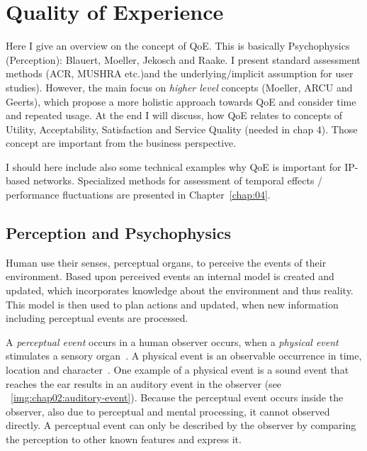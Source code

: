 \chapter{Quality of Experience}\label{chap:02}
\begin{chapter-abstract}
Here I give an overview on the concept of \ac{QoE}.
This is basically Psychophysics (Perception): Blauert, Moeller, Jekosch and Raake.
I present standard assessment methods (\ac{ACR}, \ac{MUSHRA} etc.)and the underlying/implicit assumption for user studies).
However, the main focus on \textit{higher level} concepts (Moeller, ARCU and Geerts), which propose a more holistic approach towards \ac{QoE} and consider time and repeated usage.
At the end I will discuss, how \ac{QoE} relates to concepts of Utility, Acceptability, Satisfaction and Service Quality (needed in chap 4).
Those concept are important from the business perspective.

I should here include also some technical examples why \ac{QoE} is important for \ac{IP}-based networks.
Specialized methods for assessment of temporal effects / performance fluctuations are presented in Chapter~\ref{chap:04}.
\end{chapter-abstract}

\section{Perception and Psychophysics}
Human use their senses, \ie perceptual organs, to perceive the events of their environment.
Based upon perceived events an internal model is created and updated, which incorporates knowledge about the environment and thus reality.
This model is then used to plan actions and updated, when new information including perceptual events are processed.

A \emph{perceptual event} occurs in a human observer occurs, when a \emph{physical event} stimulates a sensory organ~\cite{blauert_spatial_1996}.
A physical event is an observable occurrence in time, location and character~\cite{callet_qualinet_2013}.
One example of a physical event is a sound event that reaches the ear results in an auditory event in the observer (see ~\ref{img:chap02:auditory-event}).
Because the perceptual event occurs inside the observer, also due to perceptual and mental processing, it cannot observed directly.
A perceptual event can only be described by the observer by comparing the perception to other known features and express it.

